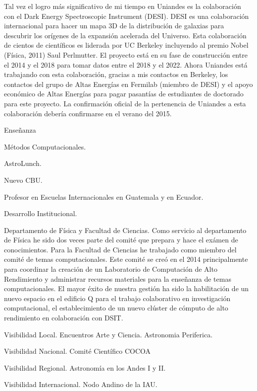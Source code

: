 Tal vez el logro más significativo de mi tiempo en Uniandes es la colaboración con el Dark Energy Spectroscopic Instrument (DESI). DESI es una colaboración internacional para hacer un mapa 3D de la distribución de galaxias para descubrir los orígenes de la expansión acelerada del Universo. Esta colaboración de cientos de científicos es liderada por UC Berkeley incluyendo al premio Nobel (Física, 2011) Saul Perlmutter. El proyecto está en su fase de construcción entre el 2014 y el 2018 para tomar datos entre el 2018 y el 2022. Ahora Uniandes está trabajando con esta colaboración, gracias a mis contactos en Berkeley, los contactos del grupo de Altas Energías en Fermilab (miembro de DESI) y el apoyo económico de Altas Energías para pagar pasantías de estudiantes de doctorado para este proyecto. La confirmación oficial de la pertenencia de Uniandes a esta colaboración debería confirmarse en el verano del 2015.



Enseñanza

Métodos Computacionales. 

AstroLunch.

Nuevo CBU.

Profesor en Escuelas Internacionales en Guatemala y en Ecuador.


Desarrollo Institucional.

Departamento de Física y Facultad de Ciencias. Como servicio al departamento de Física he sido dos veces parte del comité que prepara y hace el exámen de conocimientos. 
Para la Facultad de Ciencias he trabajado como miembro del comité de temas computacionales. Este comité se creó en el 2014 principalmente para coordinar la creación de un Laboratorio de Computación de Alto Rendimiento y administrar recursos materiales para la enseñanza de temas computacionales. El mayor éxito de nuestra gestión ha sido la habilitación de un nuevo espacio en el edificio Q para el trabajo colaborativo en investigación computacional, el establecimiento de un nuevo clúster de cómputo de alto rendimiento en colaboración con DSIT.

Visibilidad Local. Encuentros Arte y Ciencia. Astronomia Periferica.

Visibilidad Nacional. Comité Científico COCOA

Visibilidad Regional. Astronomía en los Andes I y II.

Visibilidad Internacional. Nodo Andino de la IAU. 



